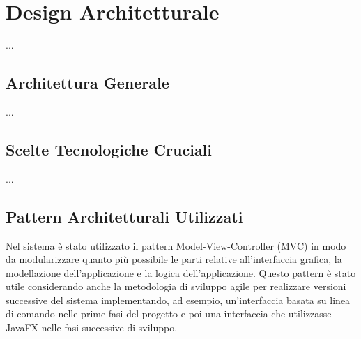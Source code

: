 

\chapter{Design Architetturale}
    ...
    \section{Architettura Generale}
    ...
    
    \section{Scelte Tecnologiche Cruciali}
    ...
    \section{Pattern Architetturali Utilizzati}
        Nel sistema è stato utilizzato il pattern Model-View-Controller (MVC) in modo da modularizzare quanto più possibile le parti relative all'interfaccia grafica, la modellazione dell'applicazione e la logica dell'applicazione. Questo pattern è stato utile considerando anche la metodologia di sviluppo agile per realizzare versioni successive del sistema implementando, ad esempio, un'interfaccia basata su linea di comando nelle prime fasi del progetto e poi una interfaccia che utilizzasse JavaFX nelle fasi successive di sviluppo.